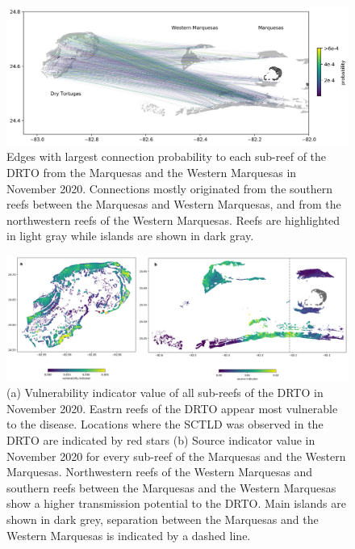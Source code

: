 \begin{figure}
    \centering
    \includegraphics[width=.9\textwidth]{chapters/drto/figures/fig3.jpg}
    \caption{Edges with largest connection probability to each sub-reef of the DRTO from the Marquesas and the Western Marquesas in November 2020. Connections mostly originated from the southern reefs between the Marquesas and Western Marquesas, and from the northwestern reefs of the Western Marquesas. Reefs are highlighted in light gray while islands are shown in dark gray.}
    \label{fig:fig3_drto}
\end{figure}

\begin{figure}
    \centering
    \includegraphics[width=.9\textwidth]{chapters/drto/figures/fig4.jpg}
    \caption{ (a) Vulnerability indicator value of all sub-reefs of the DRTO in November 2020. Eastrn reefs of the DRTO appear most vulnerable to the disease. Locations where the SCTLD was observed in the DRTO are indicated by red stars (b) Source indicator value in November 2020 for every sub-reef of the Marquesas and the Western Marquesas. Northwestern reefs of the Western Marquesas and southern reefs between the Marquesas and the Western Marquesas show a higher transmission potential to the DRTO. Main islands are shown in dark grey, separation between the Marquesas and the Western Marquesas is indicated by a dashed line.}
    \label{fig:fig4_drto}
\end{figure}


